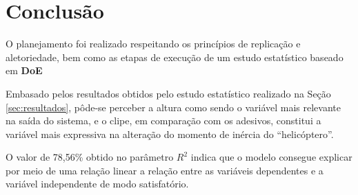 \section{Conclusão}

O planejamento foi realizado respeitando os princípios de replicação e aletoriedade, bem como as etapas de execução de um estudo estatístico baseado em \textbf{DoE}

Embasado pelos resultados obtidos pelo estudo estatístico realizado na Seção \ref{sec:resultados}, pôde-se perceber a altura como sendo o variável mais relevante na saída do sistema, e o clipe, em comparação com os adesivos, constitui a variável mais expressiva na alteração do momento de inércia do ``helicóptero''.

O valor de 78,56\% obtido no parâmetro $R^2$ indica que o modelo consegue explicar por meio de uma relação linear a relação entre as variáveis dependentes e a variável independente de modo satisfatório.